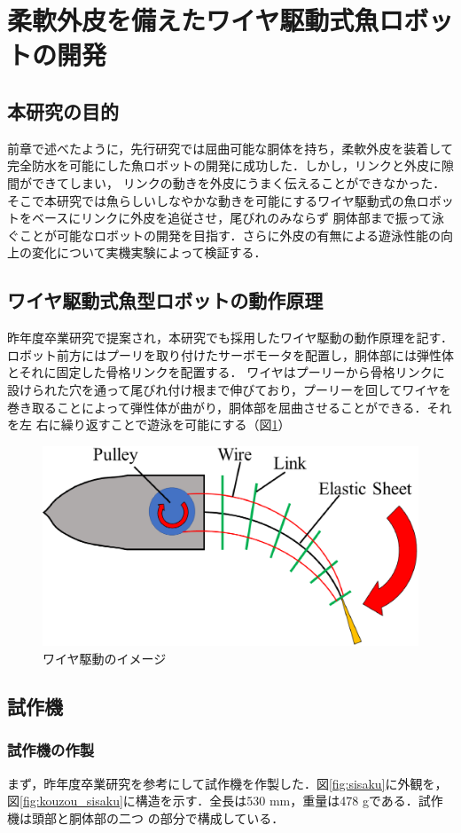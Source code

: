 \newpage
\section{柔軟外皮を備えたワイヤ駆動式魚ロボットの開発}
\subsection{本研究の目的}
前章で述べたように，先行研究\cite{kyu}では屈曲可能な胴体を持ち，柔軟外皮を装着して完全防水を可能にした魚ロボットの開発に成功した．しかし，リンクと外皮に隙間ができてしまい，
リンクの動きを外皮にうまく伝えることができなかった．そこで本研究では魚らしいしなやかな動きを可能にするワイヤ駆動式の魚ロボットをベースにリンクに外皮を追従させ，尾びれのみならず
胴体部まで振って泳ぐことが可能なロボットの開発を目指す．さらに外皮の有無による遊泳性能の向上の変化について実機実験によって検証する．

\subsection{ワイヤ駆動式魚型ロボットの動作原理}
昨年度卒業研究で提案され，本研究でも採用したワイヤ駆動の動作原理を記す．ロボット前方にはプーリを取り付けたサーボモータを配置し，胴体部には弾性体とそれに固定した骨格リンクを配置する．
ワイヤはプーリーから骨格リンクに設けられた穴を通って尾びれ付け根まで伸びており，プーリーを回してワイヤを巻き取ることによって弾性体が曲がり，胴体部を屈曲させることができる．それを左
右に繰り返すことで遊泳を可能にする（図\ref{fig:waiyakudou}）

\begin{figure}[b]
   \centering
   \includegraphics[width=0.6\linewidth]{chapters/picture/waiyakudou.eps}
   \caption{ワイヤ駆動のイメージ}
   \label{fig:waiyakudou}
\end{figure}

\subsection{試作機}
\subsubsection{試作機の作製}
まず，昨年度卒業研究を参考にして試作機を作製した．図\ref{fig:sisaku}に外観を，図\ref{fig:kouzou_sisaku}に構造を示す．全長は530 mm，重量は478 gである．試作機は頭部と胴体部の二つ
の部分で構成している．

